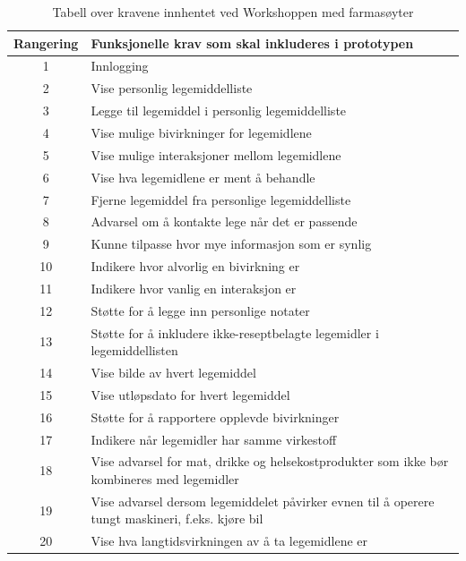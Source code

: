 \begin{table}[H]
    \centering
    \begin{tabular}{|c|p{9cm}|}
     \hline
     \textbf{Rangering} &         \textbf{Funksjonelle krav som skal inkluderes i prototypen} \\ \hline
     1 & Innlogging \\  \hline
     2 & Vise personlig legemiddelliste  \\  \hline
     3 & Legge til legemiddel i personlig legemiddelliste \\  \hline
     4 & Vise mulige bivirkninger for legemidlene \\  \hline
     5 & Vise mulige interaksjoner mellom legemidlene \\  \hline
     6 & Vise hva legemidlene er ment å behandle \\  \hline
     7 & Fjerne legemiddel fra personlige legemiddelliste \\  \hline
     8 & Advarsel om å kontakte lege når det er passende \\  \hline
     9 & Kunne tilpasse hvor mye informasjon som er synlig \\  \hline
     10 & Indikere hvor alvorlig en bivirkning er \\  \hline
     11 & Indikere hvor vanlig en interaksjon er \\  \hline
     12 & Støtte for å legge inn personlige notater \\  \hline
     13 & Støtte for å inkludere ikke-reseptbelagte legemidler i legemiddellisten \\  \hline
     14 & Vise bilde av hvert legemiddel \\  \hline
     15 & Vise utløpsdato for hvert legemiddel \\  \hline
     16 & Støtte for å rapportere opplevde bivirkninger  \\  \hline
     17 & Indikere når legemidler har samme virkestoff \\  \hline
     18 & Vise advarsel for mat, drikke og helsekostprodukter som ikke bør kombineres med legemidler \\  \hline
     19 & Vise advarsel dersom legemiddelet påvirker evnen til å operere tungt maskineri, f.eks. kjøre bil \\  \hline
     20 & Vise hva langtidsvirkningen av å ta legemidlene er \\  \hline
     \end{tabular}
    \caption{Tabell over kravene innhentet ved Workshoppen med farmasøyter }
    \label{tab:krav}
\end{table}

